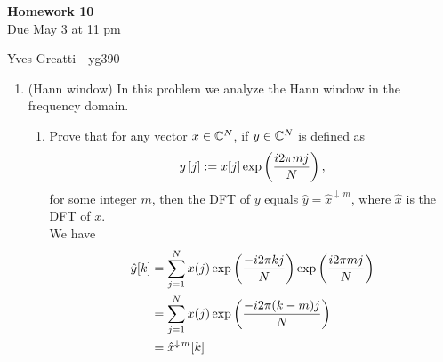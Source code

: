 \documentclass[12pt,twoside]{article}
\begin{document}
\begin{center}
{\large{\textbf{Homework 10}} } \vspace{0.2cm}\\
Due May 3 at 11 pm
\end{center}
Yves Greatti - yg390\\

\begin{enumerate}

\item (Hann window)
In this problem we analyze the Hann window in the frequency domain. 
 \begin{enumerate}
 \item Prove that for any vector $x \in \mathbb{C}^{N}$, if $y \in \mathbb{C}^{N}$ is defined as 
\begin{align}
y \,[j] := x[j] \exp \left( \frac{i2 \pi m j}{N}  \right),
\end{align}
for some integer $m$, then the DFT of $y$ equals $\hat{y}=\hat{x}^{\downarrow \, m}$, where $\hat{x}$ is the DFT of $x$.\\
We have
\begin{align*}
	\hat{y}[k]	&=	\sum_{j=1}^N x(j)  \exp \left( \frac{-i2 \pi k j}{N}  \right) \exp \left( \frac{i2 \pi m j}{N}  \right) \\
			&=	\sum_{j=1}^N x(j)  \exp \left( \frac{-i2 \pi (k-m) j}{N}  \right) \\
			&=    \hat{x}^{\downarrow \, m}[k] \\
\end{align*}


\end{enumerate}
\end{enumerate}
\end{document}
